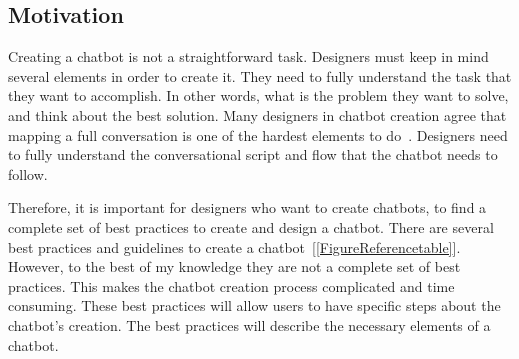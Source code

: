 \documentclass[a4paper,10pt]{article}
\begin{document}

\subsection*{Motivation}




Creating a chatbot is not a straightforward task. Designers must keep in mind several elements in order to create it. They need to fully understand the task that they want to accomplish. In other words, what is the problem they want to solve, and think about the best solution. Many designers in chatbot creation agree that mapping a full conversation is one of the hardest elements to do~\cite{OreillyBots, ConversationHurtOrHelp?}. Designers need to fully understand the conversational script and flow that the chatbot needs to follow. 

Therefore, it is important for designers who want to create chatbots, to find a complete set of best practices to create and design a chatbot. There are several best practices and guidelines to create a chatbot~[\ref{FigureReferencetable}]. However, to the best of my knowledge they are not a complete set of best practices. This makes the chatbot creation process complicated and time consuming. These best practices will allow users to have specific steps about the chatbot's creation. The best practices will describe the necessary elements of a chatbot.     
\end{document}
